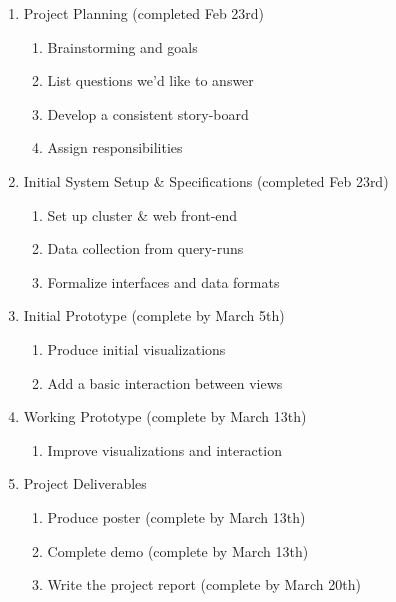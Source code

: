 \begin{enumerate}
    \item Project Planning (completed Feb 23rd)
    \begin{enumerate}
        \item Brainstorming and goals
        \item List questions we'd like to answer
        \item Develop a consistent story-board
        \item Assign responsibilities
    \end{enumerate}
    \item Initial System Setup \& Specifications (completed Feb 23rd)
    \begin{enumerate}
        \item Set up cluster \& web front-end
        \item Data collection from query-runs
        \item Formalize interfaces and data formats
    \end{enumerate}
    \item Initial Prototype (complete by March 5th)
    \begin{enumerate}
        \item Produce initial visualizations
        \item Add a basic interaction between views
    \end{enumerate}
    \item Working Prototype (complete by March 13th)
    \begin{enumerate}
        \item Improve visualizations and interaction
    \end{enumerate}
    \item Project Deliverables 
    \begin{enumerate}
        \item Produce poster (complete by March 13th)
        \item Complete demo (complete by March 13th)
        \item Write the project report (complete by March 20th)
    \end{enumerate}
\end{enumerate}




